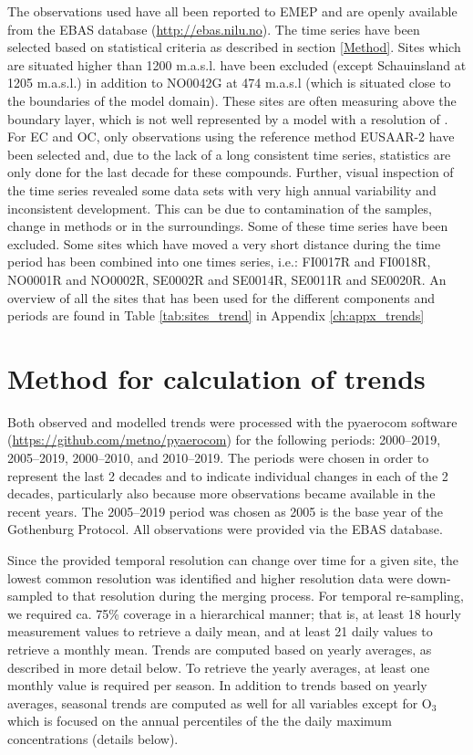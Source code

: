 The observations used have all been reported to EMEP and are openly available from the EBAS database (\url{http://ebas.nilu.no}). The time series have been selected based on statistical criteria as described in section  \ref{Method}. Sites which are situated higher than 1200 m.a.s.l. have been excluded (except Schauinsland  at 1205 m.a.s.l.) in addition to NO0042G at 474 m.a.s.l (which is situated close to the boundaries of the model domain). These sites are often measuring above the boundary layer, which is not well represented by a model with a resolution of \resZO. For EC and OC, only observations using the reference method EUSAAR-2 \citep{Cavalli:EUSAAR} have been selected and, due to the lack of a long consistent time series, statistics are only done for the last decade for these compounds. Further, visual inspection of the time series revealed some data sets with very high annual variability and inconsistent development. This can be due to contamination of the samples, change in methods or in the surroundings. Some of these time series have been excluded. Some sites which have moved a very short distance during the time period has been combined into one times series, i.e.: FI0017R and FI0018R, NO0001R and NO0002R, SE0002R and SE0014R, SE0011R and SE0020R. An overview of all the sites that has been used for the different components and periods are found in Table \ref{tab:sites_trend} in Appendix \ref{ch:appx_trends}

\section{\label{sec:Method}{Method for calculation of trends}}

Both observed and modelled trends were processed with the pyaerocom software (\url{https://github.com/metno/pyaerocom}) for the following periods: 2000--2019, 2005--2019, 2000--2010, and 2010--2019. The periods were chosen in order to represent the last 2 decades and to indicate individual changes in each of the 2 decades, particularly also because more observations became available in the recent years. The 2005--2019 period was chosen as 2005 is the base year of the Gothenburg Protocol. All observations were provided via the EBAS database. 

Since the provided temporal resolution can change over time for a given site, the lowest common resolution was identified and higher resolution data were down-sampled to that resolution during the merging process. For temporal re-sampling, we required ca. 75\% coverage in a hierarchical manner; that is, at least 18 hourly measurement values to retrieve a daily mean, and at least 21 daily values to retrieve a monthly mean. Trends are computed based on yearly averages, as described in more detail below. To retrieve the yearly averages, at least one monthly value is required per season. In addition to trends based on yearly averages, seasonal trends are computed as well for all variables except for O$_{3}$ which is focused on the annual percentiles of the the daily maximum concentrations (details below). 

